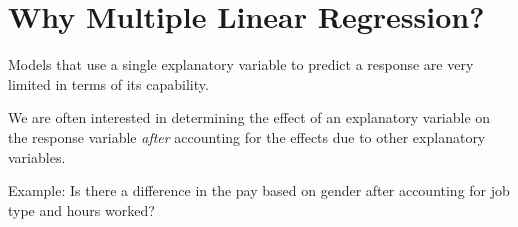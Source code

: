 \documentclass[12pt]{../notes}
\begin{document}

\section{Why Multiple Linear Regression?}
\bi
\item Models that use a single explanatory variable to predict a response are very limited in terms of its capability. 
\item We are often interested in determining the effect of an explanatory variable on the response variable \textit{after} accounting for the effects due to other explanatory variables. 
\bi
\item Example: Is there a difference in the pay based on gender after accounting for job type and hours worked? 
\ei
\ei
\end{document}
